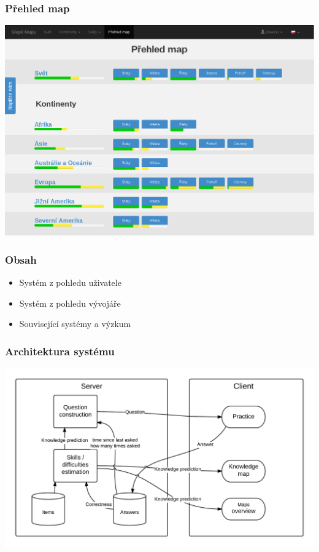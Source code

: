 \documentclass[xcolor=svgnames]{beamer}
\newcommand{\semitransp}[2][35]{\color{fg!#1}#2}
\begin{document}
\begin{frame}
	\frametitle{Přehled map}
   \includegraphics[width=\textwidth]{img/overview.png}
\end{frame}
\begin{frame}
	\frametitle{Obsah}
  \begin{itemize}
  \semitransp[20]{
  \huge \item Systém z pohledu uživatele
}
  \semitransp[100]{ 
  \huge \item Systém z pohledu vývojáře
  }
  \semitransp[20]{
  \huge \item Související systémy a výzkum
}
  \end{itemize}
\end{frame}
\begin{frame}
	\frametitle{Architektura systému}
   \includegraphics[width=\textwidth]{img/architecture.png}
\end{frame}
\end{document}
